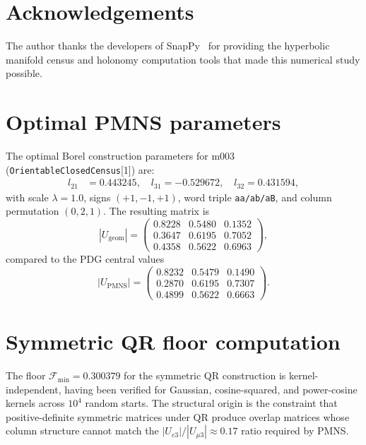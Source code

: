\documentclass[11pt,a4paper]{article}
\begin{document}
\section*{Acknowledgements}
The author thanks the developers of SnapPy~\cite{snappy} for
providing the hyperbolic manifold census and holonomy computation
tools that made this numerical study possible.


\appendix

\section{Optimal PMNS parameters}
\label{app:params}

The optimal Borel construction parameters for m003
(\texttt{OrientableClosedCensus}[1]) are:
\begin{align}
l_{21} &= 0.443245, \quad l_{31} = -0.529672, \quad l_{32} = 0.431594,
\end{align}
with scale $\lambda = 1.0$, signs $(+1, -1, +1)$, word triple
\texttt{aa/ab/aB}, and column permutation $(0, 2, 1)$.
The resulting matrix is
\begin{equation}
|U_{\mathrm{geom}}| = \begin{pmatrix}
0.8228 & 0.5480 & 0.1352 \\
0.3647 & 0.6195 & 0.7052 \\
0.4358 & 0.5622 & 0.6963
\end{pmatrix},
\end{equation}
compared to the PDG central values
\begin{equation}
|U_{\mathrm{PMNS}}| = \begin{pmatrix}
0.8232 & 0.5479 & 0.1490 \\
0.2870 & 0.6195 & 0.7307 \\
0.4899 & 0.5622 & 0.6663
\end{pmatrix}.
\end{equation}

\section{Symmetric QR floor computation}
\label{app:floor}

The floor $\mathcal{F}_{\min} = 0.300379$ for the symmetric QR
construction is kernel-independent, having been verified for
Gaussian, cosine-squared, and power-cosine kernels across
$10^4$ random starts. The structural origin is the constraint
that positive-definite symmetric matrices under QR produce
overlap matrices whose column structure cannot match the
$|U_{e3}|/|U_{\mu 3}| \approx 0.17$ ratio required by PMNS.
\end{document}
